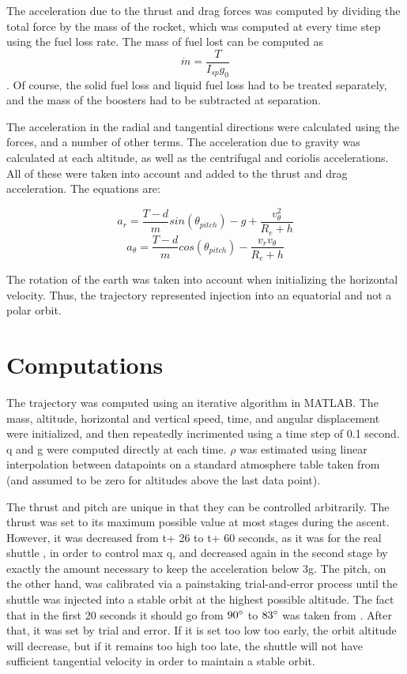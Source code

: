 \documentclass{article}
\begin{document}
The acceleration due to the thrust and drag forces was computed by dividing the total force by the mass of the rocket, which was computed at every
time step using the fuel loss rate. The mass of fuel lost can be computed as
\[\dot{m} = \frac{T}{I_{sp} g_0}\].
Of course, the solid fuel loss and liquid fuel loss had to be treated separately, and the mass of the boosters had to be subtracted at separation.

The acceleration in the radial and tangential directions were calculated using the forces, and a number of other terms. The acceleration due to
gravity was calculated at each altitude, as well as the centrifugal and coriolis accelerations. All of these were taken into account and added
to the thrust and drag acceleration. The equations are:

\[a_r = \frac{T - d}{m} sin(\theta_{pitch}) - g + \frac{v_\theta^2}{R_e + h}\]
\[a_\theta = \frac{T - d}{m} cos(\theta_{pitch}) - \frac{v_r v_\theta}{R_e + h}\]

The rotation of the earth was taken into account when initializing the horizontal velocity. Thus, the trajectory represented injection into
an equatorial and not a polar orbit.

\section{Computations}

The trajectory was computed using an iterative algorithm in MATLAB. The mass, altitude, horizontal and vertical speed, time, and
angular displacement were initialized, and then repeatedly incrimented using a time step of 0.1 second. q and g were computed directly
at each time. $\rho$ was estimated using linear interpolation between datapoints on a standard atmosphere table taken from \cite{atmo} (and
assumed to be zero for altitudes above the last data point).

The thrust and pitch are unique in that they can be controlled arbitrarily. The thrust was set to its maximum possible value at most stages
during the ascent. However, it was decreased from t+ 26 to t+ 60 seconds, as it was for the real shuttle \cite{ksc}, in order to control max q,
and decreased again in the second stage by exactly the amount necessary to keep the acceleration below 3g. The pitch, on the other hand,
was calibrated via a painstaking trial-and-error process until the shuttle was injected into a stable orbit at the highest possible altitude.
The fact that in the first 20 seconds it should go from $90\degree$ to $83\degree$ was taken from \cite{ksc}. After that, it was set by trial
and error. If it is set too low too early, the orbit altitude will decrease, but if it remains too high too late, the shuttle will not have
sufficient tangential velocity in order to maintain a stable orbit.
\end{document}

